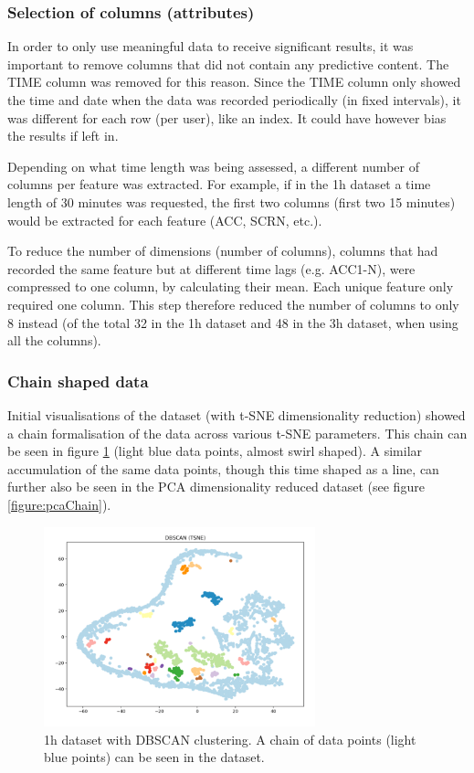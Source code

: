 \subsubsection{Selection of columns (attributes)}
In order to only use meaningful data to receive significant results, it was important to remove columns that did not contain any predictive content. The TIME column was removed for this reason. Since the TIME column only showed the time and date when the data was recorded periodically (in fixed intervals), it was different for each row (per user), like an index. It could have however bias the results if left in. 

Depending on what time length was being assessed, a different number of columns per feature was extracted. For example, if in the 1h dataset a time length of 30 minutes was requested, the first two columns (first two 15 minutes) would be extracted for each feature (ACC, SCRN, etc.).

To reduce the number of dimensions (number of columns), columns that had recorded the same feature but at different time lags (e.g. ACC1-N), were compressed to one column, by calculating their mean. Each unique feature only required one column. This step therefore reduced the number of columns to only 8 instead (of the total 32 in the 1h dataset and 48 in the 3h dataset, when using all the columns).


\subsubsection{Chain shaped data}
\label{section:chainShapedData}
Initial visualisations of the dataset (with t-SNE dimensionality reduction) showed a chain formalisation of the data across various t-SNE parameters. This chain can be seen in figure \ref{figure:tsneChain} (light blue data points, almost swirl shaped). A similar accumulation of the same data points, though this time shaped as a line, can further also be seen in the PCA dimensionality reduced dataset (see figure \ref{figure:pcaChain}). 


\begin{figure}[h]
  \centering
  \includegraphics[width=0.7\textwidth]{./images/tsneChain.png}
  \caption{1h dataset with DBSCAN clustering. A chain of data points (light blue points) can be seen in the dataset.}
  \label{figure:tsneChain}
\end{figure}


